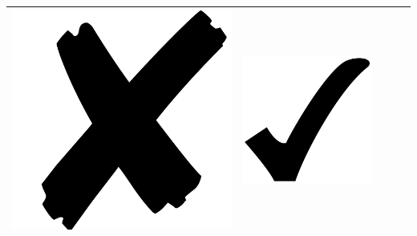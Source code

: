 \documentclass[
	12pt,				%
	openright,			%
	oneside,			%
	a4paper,			%
	english,			%
	brazil,				%
	]{abntex2}
\begin{document}
\begin{table}[h!]
\begin{tabular}{M|L|L|L|L}
\includegraphics[scale=0.007]{x.png}                      & \includegraphics[scale=0.015]{check.png}                             \\ \hline

\end{tabular}
\end{table}
\end{document}
